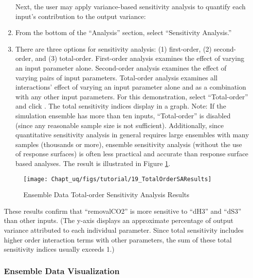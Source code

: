 \begin{enumerate}
Next, the user may apply variance-based sensitivity analysis to quantify each input’s contribution to the output variance:

\item{From the bottom of the ``Analysis'' section, select ``Sensitivity Analysis.''}
\item{There are three options for sensitivity analysis: (1) first-order, (2) second-order, and (3) total-order. First-order analysis examines the effect of varying an input parameter alone. Second-order analysis examines the effect of varying pairs of input parameters. Total-order analysis examines all interactions' effect of varying an input parameter alone and as a combination with any other input parameters. For this demonstration, select ``Total-order'' and click . The total sensitivity indices display in a graph. Note: If the simulation ensemble has more than ten inputs, ``Total-order'' is disabled (since any reasonable sample size is not sufficient). Additionally, since quantitative sensitivity analysis in general requires large ensembles with many samples (thousands or more), ensemble sensitivity analysis (without the use of response surfaces) is often less practical and accurate than response surface based analyses.  The result is illustrated in Figure \ref{fig:uqt_sa_results}.}
\end{enumerate}

\begin{figure}[H]
\centering \texttt{[image: Chapt\_uq/figs/tutorial/19\_TotalOrderSAResults]}
\caption{Ensemble Data Total-order Sensitivity Analysis Results}
\label{fig:uqt_sa_results}
\end{figure}

These results confirm that ``removalCO2'' is more sensitive to ``dH3'' and ``dS3'' than other inputs. (The y-axis displays an approximate percentage of output variance attributed to each individual parameter. Since total sensitivity includes higher order interaction terms with other parameters, the sum of these total sensitivity indices usually exceeds 1.)

\subsubsection{Ensemble Data Visualization}

